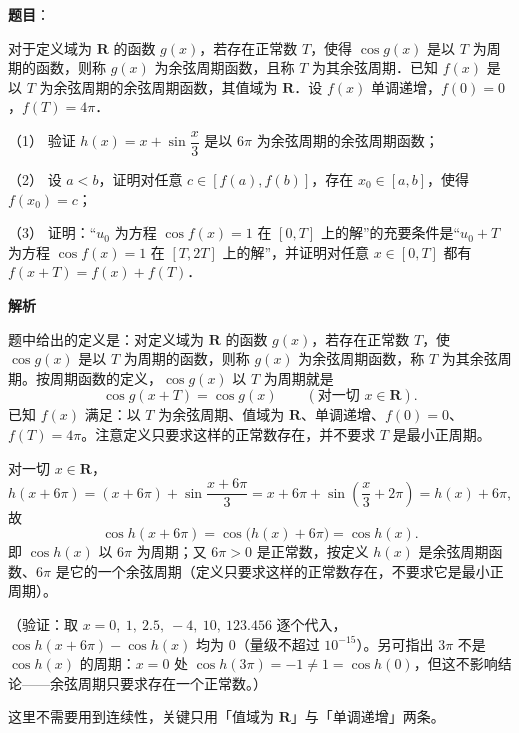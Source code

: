 \begin{answer}

\textbf{题目}：

对于定义域为 \(\mathbf{R}\) 的函数 \(g(x)\)，若存在正常数 \(T\)，使得 \(\cos g(x)\) 是以 \(T\) 为周期的函数，则称 \(g(x)\) 为余弦周期函数，且称 \(T\) 为其余弦周期．已知 \(f(x)\) 是以 \(T\) 为余弦周期的余弦周期函数，其值域为 \(\mathbf{R}\)．设 \(f(x)\) 单调递增，\(f(0)=0\)，\(f(T)=4\pi\)．

（1） 验证 \(h(x)=x+\sin\dfrac{x}{3}\) 是以 \(6\pi\) 为余弦周期的余弦周期函数；

（2） 设 \(a<b\)，证明对任意 \(c\in[f(a),f(b)]\)，存在 \(x_{0}\in[a,b]\)，使得 \(f(x_{0})=c\)；

（3） 证明：“\(u_{0}\) 为方程 \(\cos f(x)=1\) 在 \([0,T]\) 上的解”的充要条件是“\(u_{0}+T\) 为方程 \(\cos f(x)=1\) 在 \([T,2T]\) 上的解”，并证明对任意 \(x\in[0,T]\) 都有 \(f(x+T)=f(x)+f(T)\)．

\textbf{解析}

题中给出的定义是：对定义域为 \(\mathbf{R}\) 的函数 \(g(x)\)，若存在正常数 \(T\)，使 \(\cos g(x)\) 是以 \(T\) 为周期的函数，则称 \(g(x)\) 为余弦周期函数，称 \(T\) 为其余弦周期。按周期函数的定义，\(\cos g(x)\) 以 \(T\) 为周期就是
\nopagebreak[4]
\[
\cos g(x+T)=\cos g(x)\qquad(\text{对一切 }x\in\mathbf{R}).
\]
已知 \(f(x)\) 满足：以 \(T\) 为余弦周期、值域为 \(\mathbf{R}\)、单调递增、\(f(0)=0\)、\(f(T)=4\pi\)。注意定义只要求这样的正常数存在，并不要求 \(T\) 是最小正周期。


对一切 \(x\in\mathbf{R}\)，
\nopagebreak[4]
\[
h(x+6\pi)=(x+6\pi)+\sin\frac{x+6\pi}{3}=x+6\pi+\sin\left(\frac{x}{3}+2\pi\right)=h(x)+6\pi ,
\]
故
\nopagebreak[4]
\[
\cos h(x+6\pi)=\cos\bigl(h(x)+6\pi\bigr)=\cos h(x).
\]
即 \(\cos h(x)\) 以 \(6\pi\) 为周期；又 \(6\pi>0\) 是正常数，按定义 \(h(x)\) 是余弦周期函数、\(6\pi\) 是它的一个余弦周期（定义只要求这样的正常数存在，不要求它是最小正周期）。

（验证：取 \(x=0,\ 1,\ 2.5,\ -4,\ 10,\ 123.456\) 逐个代入，\(\cos h(x+6\pi)-\cos h(x)\) 均为 \(0\)（量级不超过 \(10^{-15}\)）。另可指出 \(3\pi\) 不是 \(\cos h(x)\) 的周期：\(x=0\) 处 \(\cos h(3\pi)=-1\neq1=\cos h(0)\)，但这不影响结论——余弦周期只要求存在一个正常数。）


这里不需要用到连续性，关键只用「值域为 \(\mathbf{R}\)」与「单调递增」两条。


\end{answer}
